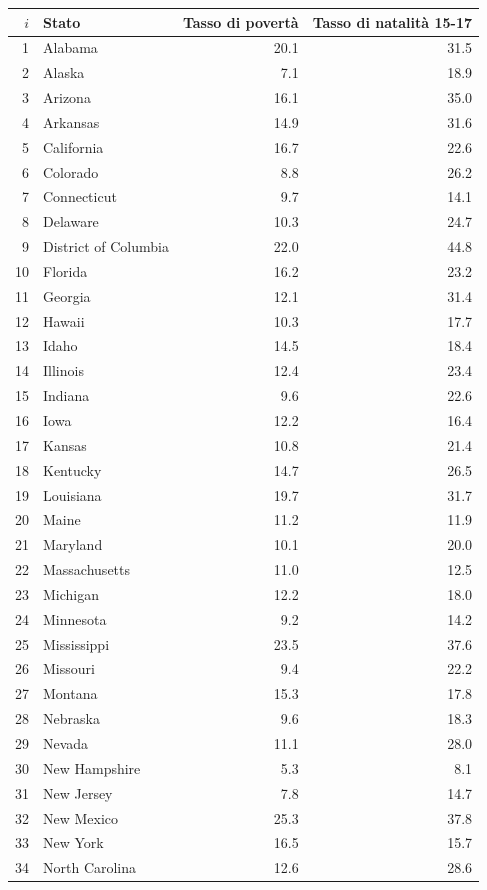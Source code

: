 \documentclass[
  11pt,
]{book}
\theoremstyle{mytheoremstyle}
\theoremstyle{mydefstyle}
\begin{document}
\begin{table}[H]
\centering
\begin{tabular}{rlrr}
\toprule
$i$ & Stato & Tasso di povertà & Tasso di natalità 15-17\\
\midrule
1 & Alabama & 20.1 & 31.5\\
2 & Alaska & 7.1 & 18.9\\
3 & Arizona & 16.1 & 35.0\\
4 & Arkansas & 14.9 & 31.6\\
5 & California & 16.7 & 22.6\\
6 & Colorado & 8.8 & 26.2\\
7 & Connecticut & 9.7 & 14.1\\
8 & Delaware & 10.3 & 24.7\\
9 & District of Columbia & 22.0 & 44.8\\
10 & Florida & 16.2 & 23.2\\
11 & Georgia & 12.1 & 31.4\\
12 & Hawaii & 10.3 & 17.7\\
13 & Idaho & 14.5 & 18.4\\
14 & Illinois & 12.4 & 23.4\\
15 & Indiana & 9.6 & 22.6\\
16 & Iowa & 12.2 & 16.4\\
17 & Kansas & 10.8 & 21.4\\
18 & Kentucky & 14.7 & 26.5\\
19 & Louisiana & 19.7 & 31.7\\
20 & Maine & 11.2 & 11.9\\
21 & Maryland & 10.1 & 20.0\\
22 & Massachusetts & 11.0 & 12.5\\
23 & Michigan & 12.2 & 18.0\\
24 & Minnesota & 9.2 & 14.2\\
25 & Mississippi & 23.5 & 37.6\\
26 & Missouri & 9.4 & 22.2\\
27 & Montana & 15.3 & 17.8\\
28 & Nebraska & 9.6 & 18.3\\
29 & Nevada & 11.1 & 28.0\\
30 & New Hampshire & 5.3 & 8.1\\
31 & New Jersey & 7.8 & 14.7\\
32 & New Mexico & 25.3 & 37.8\\
33 & New York & 16.5 & 15.7\\
34 & North Carolina & 12.6 & 28.6\\

\end{tabular}
\end{table}
\end{document}
